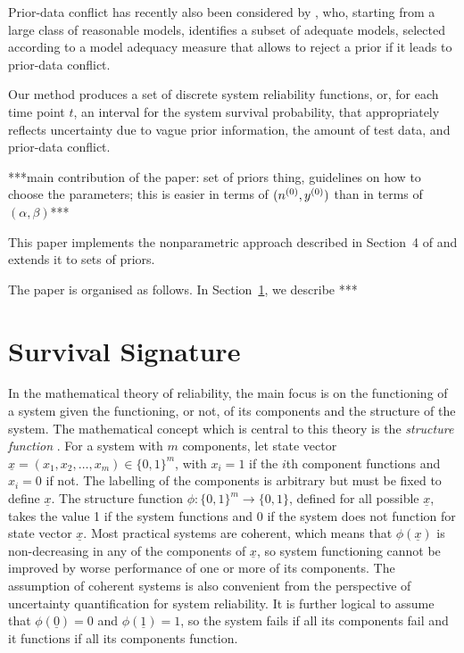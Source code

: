 \documentclass[12pt, a4paper]{elsarticle}
\begin{document}
Prior-data conflict has recently also been considered by \citet{2015:bickel},
who, starting from a large class of reasonable models,
identifies a subset of adequate models,
selected according to a model adequacy measure that allows to reject a prior if it leads to prior-data conflict.



Our method produces a set of discrete system reliability functions,
or, for each time point $t$, an interval for the system survival probability,
that appropriately reflects uncertainty due to vague prior information, the amount of test data, and prior-data conflict.

***main contribution of the paper:
set of priors thing,
guidelines on how to choose the parameters;
this is easier in terms of $(n^{(0)}, y^{(0)})$ than in terms of $(\alpha, \beta)$***

This paper implements the nonparametric approach described in Section~4 of \citet{2015:bayessurvsign}
and extends it to sets of priors.

The paper is organised as follows.
In Section~\ref{sec:survsign}, we describe ***


\section{Survival Signature}
\label{sec:survsign}

In the mathematical theory of reliability, the main focus is on the functioning of a system given the functioning, or not, 
of its components and the structure of the system. The mathematical concept which is central to this theory is the 
\emph{structure function} \citep{BP75}. For a system with $m$ components, let state vector 
$\underline{x} = (x_1,x_2,\ldots,x_m) \in \{0,1\}^m$, with $x_i=1$ if the $i$th component functions 
and $x_i=0$ if not. The labelling of the components is arbitrary but must be fixed to define $\underline{x}$. 
The structure function $\phi : \{0,1\}^m \rightarrow \{0,1\}$, defined for all possible $\underline{x}$, takes 
the value 1 if the system functions and 0 if the system does not function for state vector $\underline{x}$. 
Most practical systems are coherent, which means that $\phi(\underline{x})$ 
is non-decreasing in any of the components of $\underline{x}$, so system functioning cannot be improved by worse performance 
of one or more of its components. The assumption of coherent systems is also convenient from the perspective of uncertainty
quantification for system reliability. It is further logical to assume that $\phi(\underline{0})=0$ and $\phi(\underline{1})=1$, 
so the system fails if all its components fail and it functions if all its components function. 
\end{document}
